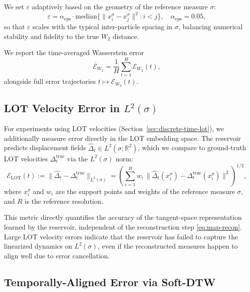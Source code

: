 \documentclass[11pt]{article}
\newcommand{\1}{\mathbf{1}}
\begin{document}
We set $\varepsilon$ adaptively based on the geometry of the reference measure $\sigma$:
\begin{equation}\label{eq:eps-heuristic}
\varepsilon = \alpha_{\text{eps}} \cdot \mathrm{median}\bigl\{\|x_i^\sigma - x_j^\sigma\|^2 : i < j\bigr\},
\quad \alpha_{\text{eps}} = 0.05,
\end{equation}
so that $\varepsilon$ scales with the typical inter-particle spacing in $\sigma$, balancing numerical stability and fidelity to the true $W_2$ distance.

We report the time-averaged Wasserstein error
\begin{equation}
\overline{\mathcal{E}}_{W_2} = \frac{1}{H}\sum_{t=1}^H \mathcal{E}_{W_2}(t),
\end{equation}
alongside full error trajectories $t \mapsto \mathcal{E}_{W_2}(t)$.

\subsection{LOT Velocity Error in $L^2(\sigma)$}\label{sec:metric-lot}

For experiments using LOT velocities (Section~\ref{sec:discrete-time-lot}), we additionally measure error directly in the LOT embedding space. The reservoir predicts displacement fields $\widehat{\Delta}_t \in L^2(\sigma; \mathbb{R}^2)$, which we compare to ground-truth LOT velocities $\Delta_t^{\text{true}}$ via the $L^2(\sigma)$ norm:
\begin{equation}\label{eq:lot-vel-error}
\mathcal{E}_{\mathrm{LOT}}(t) 
:= \|\widehat{\Delta}_t - \Delta_t^{\text{true}}\|_{L^2(\sigma)}
= \left(\sum_{i=1}^R w_i \,\big\|\widehat{\Delta}_t(x_i^\sigma) - \Delta_t^{\text{true}}(x_i^\sigma)\big\|^2\right)^{1/2},
\end{equation}
where $x_i^\sigma$ and $w_i$ are the support points and weights of the reference measure $\sigma$, and $R$ is the reference resolution.

This metric directly quantifies the accuracy of the tangent-space representation learned by the reservoir, independent of the reconstruction step \eqref{eq:map-recon}. Large LOT velocity errors indicate that the reservoir has failed to capture the linearized dynamics on $L^2(\sigma)$, even if the reconstructed measures happen to align well due to error cancellation.

\subsection{Temporally-Aligned Error via Soft-DTW}\label{sec:metric-dtw}
\end{document}
